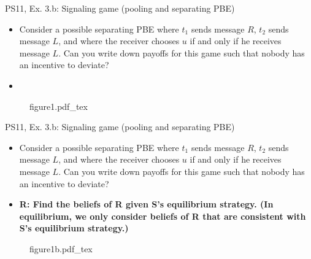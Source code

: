 \begin{frame}{PS11, Ex. 3.b: Signaling game (pooling and separating PBE)}
    \begin{itemize}
        \item[(b)] Consider a possible separating PBE where $t_1$ sends message $R$, $t_2$ sends message $L$, and where the receiver chooses $u$ if and only if he receives message $L$. Can you write down payoffs for this game such that nobody has an incentive to deviate?
    \end{itemize} \vspace{-8pt}
    \begin{multicols}{2}
      \begin{itemize}
        \item[SR3:]
      \end{itemize}
      \vfill\null\columnbreak
      \begin{figure}[!h]
        \center
        \def\svgwidth{\columnwidth}
        {figure1.pdf_tex}
      \end{figure}
      \vfill\null \columnbreak
      \vfill
    \end{multicols}
\end{frame}
\begin{frame}{PS11, Ex. 3.b: Signaling game (pooling and separating PBE)}
    \begin{itemize}
        \item[(b)] Consider a possible separating PBE where $t_1$ sends message $R$, $t_2$ sends message $L$, and where the receiver chooses $u$ if and only if he receives message $L$. Can you write down payoffs for this game such that nobody has an incentive to deviate?
    \end{itemize} \vspace{-8pt}
    \begin{multicols}{2}
      \begin{itemize}
        \item[SR3:] \textbf{R: Find the beliefs of R given S's equilibrium strategy. (In equilibrium, we only consider beliefs of R that are consistent with S's equilibrium strategy.)}
      \end{itemize}
      \vfill\null\columnbreak
      \begin{figure}[!h]
        \center
        \def\svgwidth{\columnwidth}
        {figure1b.pdf_tex}
      \end{figure}
      \vfill\null \columnbreak
      \vfill
    \end{multicols}
\end{frame}
